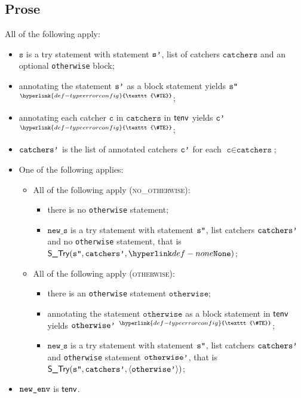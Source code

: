 \documentclass{book}
\newcommand\TypeErrorConfig[0]{\hyperlink{def-typeerrorconfig}{\texttt{\#TE}}}
\newcommand\ProseOrTypeError[0]{\hyperlink{def-proseortypeerror}{$^{\TypeErrorConfig}$}}
\newcommand\vc[0]{\texttt{c}}
\newcommand\vs[0]{\texttt{s}}
\newcommand\news[0]{\texttt{new\_s}}
\newcommand\catchers[0]{\texttt{catchers}}
\newcommand\otherwise[0]{\texttt{otherwise}}
\begin{document}
\subsection{Prose}
All of the following apply:
\begin{itemize}
  \item $\vs$ is a try statement with statement $\texttt{s'}$, list of catchers $\catchers$ and an optional \texttt{otherwise} block;
  \item annotating the statement $\texttt{s'}$ as a block statement yields $\texttt{s''}$ \ProseOrTypeError;
  \item annotating each catcher $\vc$ in $\catchers$ in $\textsf{tenv}$ yields $\texttt{c'}$ \ProseOrTypeError;
  \item $\texttt{catchers'}$ is the list of annotated catchers $\texttt{c'}$ for each $\vc\in\catchers$;
  \item One of the following applies:
  \begin{itemize}
    \item All of the following apply (\textsc{no\_otherwise}):
    \begin{itemize}
      \item there is no \texttt{otherwise} statement;
      \item $\news$ is a try statement with statement $\texttt{s''}$, list catchers $\texttt{catchers'}$ and no \texttt{otherwise} statement,
            that is \\
            $\STry(\vspp, \catchersp, \None)$;
    \end{itemize}

    \item All of the following apply (\textsc{otherwise}):
    \begin{itemize}
      \item there is an \texttt{otherwise} statement $\otherwise$;
      \item annotating the statement $\otherwise$ as a block statement in $\textsf{tenv}$ yields $\texttt{otherwise'}$ \ProseOrTypeError;
      \item $\news$ is a try statement with statement $\texttt{s''}$, list catchers $\texttt{catchers'}$ and \texttt{otherwise} statement
            $\texttt{otherwise'}$, that is \\
            $\textsf{S\_Try}(\texttt{s''}, \texttt{catchers'}, \langle\texttt{otherwise'}\rangle)$;
    \end{itemize}
  \end{itemize}
  \item $\texttt{new\_env}$ is $\textsf{tenv}$.
\end{itemize}
\end{document}
